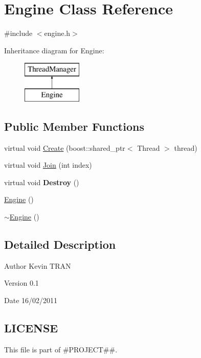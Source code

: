 \hypertarget{classEngine}{
\section{Engine Class Reference}
\label{d1/db6/classEngine}
}


{\ttfamily \#include $<$engine.h$>$}

Inheritance diagram for Engine:\begin{figure}[H]
\begin{center}
\leavevmode
\includegraphics[height=2cm]{d1/db6/classEngine}
\end{center}
\end{figure}
\subsection*{Public Member Functions}
\begin{DoxyCompactItemize}
\item 
virtual void \hyperlink{classEngine_a5de6694a069170d2205599331e6e8691}{Create} (boost::shared\_\-ptr$<$ Thread $>$ thread)
\item 
virtual void \hyperlink{classEngine_afe5c1c859cfe9b121627156dfbd58e6b}{Join} (int index)
\item 
\hypertarget{classEngine_ade901a4373d3ee77b6eb716ce84dc9bb}{
virtual void {\bfseries Destroy} ()}
\label{d1/db6/classEngine_ade901a4373d3ee77b6eb716ce84dc9bb}

\item 
\hyperlink{classEngine_a8c98683b0a3aa28d8ab72a8bcd0d52f2}{Engine} ()
\item 
\hyperlink{classEngine_a8ef7030a089ecb30bbfcb9e43094717a}{$\sim$Engine} ()
\end{DoxyCompactItemize}


\subsection{Detailed Description}
\begin{DoxyAuthor}{Author}
Kevin TRAN 
\end{DoxyAuthor}
\begin{DoxyVersion}{Version}
0.1 
\end{DoxyVersion}
\begin{DoxyDate}{Date}
16/02/2011 
\end{DoxyDate}
\hypertarget{d6/d40/classThread_3_01TM_01_4_LICENSE}{}\subsection{LICENSE}\label{d6/d40/classThread_3_01TM_01_4_LICENSE}
This file is part of \#PROJECT\#\#.

